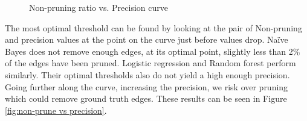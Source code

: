 \documentclass[]{UCD_CS_FYP_Report}
\begin{document}
\begin{figure}[!h]
    \centering
    \hfill
    \hfill
    \caption{Non-pruning ratio vs. Precision curve}
\end{figure}\label{fig:non-prune vs precision}

The most optimal threshold can be found by looking at the pair of Non-pruning and precision values at the point on the curve just before values drop. Naïve Bayes does not remove enough edges, at its optimal point, slightly less than 2\% of the edges have been pruned. Logistic regression and Random forest perform similarly. Their optimal thresholds also do not yield a high enough precision. Going further along the curve, increasing the precision, we risk over pruning which could remove ground truth edges. These results can be seen in Figure \ref{fig:non-prune vs precision}.
\end{document}
